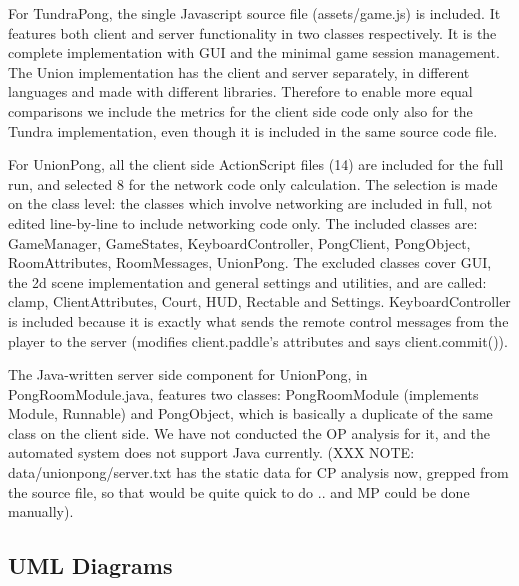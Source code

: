 \documentclass[conference]{IEEEtran}
\begin{document}
% 
% 
% 
% 
% 
% 
% 

For TundraPong, the single Javascript source file (assets/game.js) is
included. It features both client and server functionality in two
classes respectively. It is the complete implementation with GUI and
the minimal game session management. The Union implementation has the
client and server separately, in different languages and made with
different libraries. Therefore to enable more equal comparisons we
include the metrics for the client side code only also for the Tundra
implementation, even though it is included in the same source code
file.

For UnionPong, all the client side ActionScript files (14) are
included for the full run, and selected 8 for the network code only
calculation. The selection is made on the class level: the classes
which involve networking are included in full, not edited line-by-line
to include networking code only. The included classes are:
GameManager, GameStates, KeyboardController, PongClient, PongObject,
RoomAttributes, RoomMessages, UnionPong. The excluded classes cover
GUI, the 2d scene implementation and general settings and utilities,
and are called: clamp, ClientAttributes, Court, HUD, Rectable and
Settings. KeyboardController is included because it is exactly what
sends the remote control messages from the player to the server
(modifies client.paddle's attributes and says client.commit()).

The Java-written server side component for UnionPong, in
PongRoomModule.java, features two classes: PongRoomModule (implements
Module, Runnable) and PongObject, which is basically a duplicate of
the same class on the client side. We have not conducted the OP
analysis for it, and the automated system does not support Java
currently. (XXX NOTE: data/unionpong/server.txt has the static data
for CP analysis now, grepped from the source file, so that would be
quite quick to do .. and MP could be done manually).


\subsection{UML Diagrams%
  \label{uml-diagrams}%
}
\end{document}
